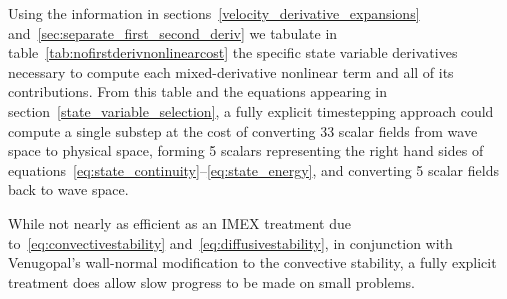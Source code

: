 \documentclass[letterpaper,11pt,nointlimits,reqno,draft]{amsbook}
\begin{document}
Using the information in sections~\ref{velocity_derivative_expansions}
and~\ref{sec:separate_first_second_deriv} we tabulate in
table~\vref{tab:nofirstderivnonlinearcost} the specific state variable
derivatives necessary to compute each mixed-derivative nonlinear term and all
of its contributions.  From this table and the equations appearing in
section~\ref{state_variable_selection}, a fully explicit timestepping approach
could compute a single substep at the cost of converting 33 scalar fields from
wave space to physical space, forming 5 scalars representing the right hand
sides of equations~\eqref{eq:state_continuity}--\eqref{eq:state_energy}, and
converting 5 scalar fields back to wave space.

While not nearly as efficient as an IMEX treatment due
to~\eqref{eq:convectivestability} and~\eqref{eq:diffusivestability}, in
conjunction with Venugopal's wall-normal modification to the convective
stability, a fully explicit treatment does allow slow progress to be made on
small problems.
\end{document}
